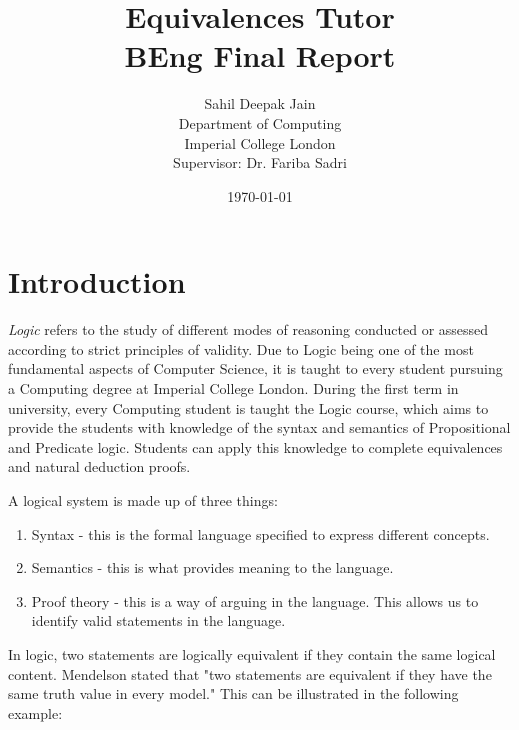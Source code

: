 \documentclass[11pt]{article}
\begin{document}
\title{Equivalences Tutor\\BEng Final Report}

\author{Sahil Deepak Jain\\Department of Computing\\Imperial College London\\Supervisor: Dr. Fariba Sadri}
\date{\today}

\maketitle
\newpage

\begin{abstract}

\end{abstract}
\newpage

\tableofcontents

\newpage

\section{Introduction}

\emph{Logic} refers to the study of different modes of reasoning conducted or 
assessed according to strict principles of validity. Due to Logic being one of 
the most fundamental aspects of Computer Science, it is taught to every student
pursuing a Computing degree at Imperial College London. During the first term 
in university, every Computing student is taught the Logic course, which aims to
provide the students with knowledge of the syntax and semantics of Propositional 
and Predicate logic. Students can apply this knowledge to complete equivalences
and natural deduction proofs.

A logical system is made up of three things:
\begin{enumerate}
  \item Syntax - this is the formal language specified to express different
         concepts.
  \item Semantics - this is what provides meaning to the language.
  \item Proof theory - this is a way of arguing in the language. This allows us
         to identify valid statements in the language.
\end{enumerate}

In logic, two statements are logically equivalent if they contain the same
logical content. Mendelson stated that "two statements are equivalent if they
have the same truth value in every model." This can be illustrated in the 
following example: \\ \bigskip 
\end{document}

